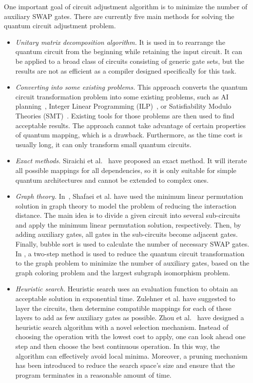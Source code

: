 \documentclass[journal]{IEEEtran}
\begin{document}
One important goal of circuit adjustment algorithm is to minimize the number of auxiliary SWAP gates. There are currently five main methods for solving the quantum circuit adjustment problem.
\begin{itemize}
  \item
\emph{Unitary matrix decomposition algorithm.} It is used in \cite{2019CNOT,2019Quantum} to rearrange the quantum circuit from the beginning while retaining the input circuit. It can be applied to a broad class of circuits consisting of generic gate sets, but the results are not as efficient as a compiler designed specifically for this task.
\item
\emph{Converting into some existing problems.} This approach converts the quantum circuit transformation problem into some existing problems, such as AI planning~\cite{2017Temporal,2018Integer}, Integer Linear Programming (ILP)~\cite{2019Almeida}, or Satisfiability Modulo Theories (SMT)~\cite{2019Murali}. Existing tools for those problems are then used to find acceptable results. The approach cannot take advantage of certain properties of quantum mapping, which is a drawback. Furthermore, as the time cost is usually long, it can only transform small quantum circuits.
\item
\emph{Exact methods.}
Siraichi et al.~\cite{2018QubitSiraichi} have proposed an exact method. It will iterate all possible mappings for all dependencies, so it is only suitable for simple quantum architectures and cannot be extended to complex ones.
\item
\emph{Graph theory.} 
In~\cite{Shafaei2013}, Shafaei et al. have used the minimum linear permutation solution in graph theory to model the problem of reducing the interaction distance. The main idea is to divide a given circuit into several  sub-circuits and apply the minimum linear permutation solution, respectively. Then, by adding auxiliary gates, all gates in the sub-circuits become adjacent gates. Finally, bubble sort is used to calculate the number of necessary SWAP gates. In \cite{Guerreschi2018,Matsuo2019}, a two-step method is used to reduce the quantum circuit transformation to the graph problem to minimize the number of auxiliary gates, based on the graph coloring problem and the largest subgraph isomorphism problem.
\item
\emph{Heuristic search.}
Heuristic search uses an evaluation function to obtain an acceptable solution in exponential time. Zulehner et al. \cite{Zulehner2017} have suggested to layer the circuits, then determine compatible mappings for each of these layers to add as few auxiliary gates as possible. Zhou et al.~\cite{Xiangzhen2020} have designed a heuristic search algorithm with a novel selection mechanism. Instead of choosing the operation with the lowest cost to apply, one can look ahead one step and then choose the best continuous operation. In this way, the algorithm can effectively avoid local minima. Moreover, a pruning mechanism has been introduced to reduce the search space's size and ensure that the program terminates in a reasonable amount of time.


\end{itemize}
\end{document}
